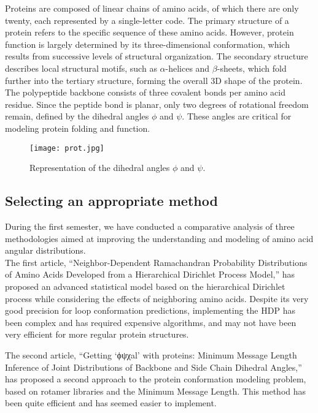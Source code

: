 \documentclass{article}
\begin{document}
Proteins are composed of linear chains of amino acids, of which there are only twenty, each represented by a single-letter code. The primary structure of a protein refers to the specific sequence of these amino acids. However, protein function is largely determined by its three-dimensional conformation, which results from successive levels of structural organization. 
The secondary structure describes local structural motifs, such as $\alpha$-helices and $\beta$-sheets, which fold further into the tertiary structure, forming the overall 3D shape of the protein. The polypeptide backbone consists of three covalent bonds per amino acid residue. Since the peptide bond is planar, only two degrees of rotational freedom remain, defined by the dihedral angles $\phi$ and $\psi$. These angles are critical for modeling protein folding and function.  \\

\begin{figure}[h]
    \centering
    \texttt{[image: prot.jpg]}
    \caption{\label{fig:frog}Representation of the dihedral angles $\phi$ and $\psi$.}
\end{figure}

\subsection*{Selecting an appropriate method}  

During the first semester, we have conducted a comparative analysis of three methodologies aimed at improving the understanding and modeling of amino acid angular distributions. \\

The first article, “Neighbor-Dependent Ramachandran Probability Distributions of Amino Acids Developed from a Hierarchical Dirichlet Process Model,” has proposed an advanced statistical model based on the hierarchical Dirichlet process while considering the effects of neighboring amino acids. Despite its very good precision for loop conformation predictions, implementing the HDP has been complex and has required expensive algorithms, and may not have been very efficient for more regular protein structures.

The second article, “Getting ‘ϕψχal’ with proteins: Minimum Message Length Inference of Joint Distributions of Backbone and Side Chain Dihedral Angles,” has proposed a second approach to the protein conformation modeling problem, based on rotamer libraries and the Minimum Message Length. This method has been quite efficient and has seemed easier to implement.
\end{document}
